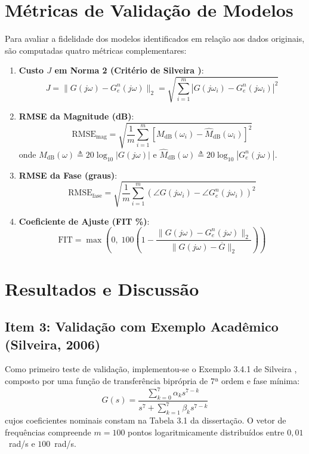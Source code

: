 \documentclass[journal,10pt,twocolumn]{IEEEtran}
\begin{document}
\section{Métricas de Validação de Modelos}
Para avaliar a fidelidade dos modelos identificados em relação aos dados originais, são computadas quatro métricas complementares:
\begin{enumerate}
    \item \textbf{Custo $J$ em Norma 2 (Critério de Silveira \cite{silveira2006})}:
    \begin{equation}
        J = \| G(j\omega) - G_e^n(j\omega) \|_2 = \sqrt{\sum_{i=1}^m |G(j\omega_i) - G_e^n(j\omega_i)|^2}
    \end{equation}
    \item \textbf{RMSE da Magnitude (dB)}:
    \begin{equation}
        \text{RMSE}_{\text{mag}} = \sqrt{\frac{1}{m} \sum_{i=1}^m \left[ M_{\text{dB}}(\omega_i) - \hat{M}_{\text{dB}}(\omega_i) \right]^2}
    \end{equation}
    onde $M_{\text{dB}}(\omega) \triangleq 20\log_{10}|G(j\omega)|$ e $\hat{M}_{\text{dB}}(\omega) \triangleq 20\log_{10}|G_e^n(j\omega)|$.
    \item \textbf{RMSE da Fase (graus)}:
    \begin{equation}
        \text{RMSE}_{\text{fase}} = \sqrt{\frac{1}{m} \sum_{i=1}^m \left( \angle G(j\omega_i) - \angle G_e^n(j\omega_i) \right)^2}
    \end{equation}
    \item \textbf{Coeficiente de Ajuste (FIT \%)}:
    \begin{equation}
        \text{FIT} = \max \left( 0, \; 100 \left( 1 - \frac{\|G(j\omega) - G_e^n(j\omega)\|_2}{\|G(j\omega) - \overline{G}\|_2} \right) \right)
    \end{equation}
\end{enumerate}

\section{Resultados e Discussão}

\subsection{Item 3: Validação com Exemplo Acadêmico (Silveira, 2006)}
Como primeiro teste de validação, implementou-se o Exemplo 3.4.1 de Silveira \cite{silveira2006}, composto por uma função de transferência biprópria de 7ª ordem e fase mínima:
\begin{equation}
    G(s) = \frac{\sum_{k=0}^7 \alpha_k s^{7-k}}{s^7 + \sum_{k=1}^7 \beta_k s^{7-k}}
\end{equation}
cujos coeficientes nominais constam na Tabela 3.1 da dissertação. O vetor de frequências compreende $m = 100$ pontos logaritmicamente distribuídos entre $0,01$~rad/s e $100$~rad/s.
\end{document}
